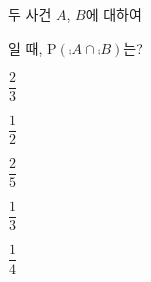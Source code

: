두 사건 $A$, $B$에 대하여 \par\smallskip{}\par\smallskip\noindent 일 때, $\mathrm{P}(\comp{A}\cap\comp{B})$는?
\begin{choices32}{\rule[-3ex]{0pt}{8ex}$\dfrac{2}{3}$}{\rule[-3ex]{0pt}{8ex}$\dfrac{1}{2}$}{\rule[-3ex]{0pt}{8ex}$\dfrac{2}{5}$}{\rule[-3ex]{0pt}{8ex}$\dfrac{1}{3}$}{\rule[-3ex]{0pt}{8ex}$\dfrac{1}{4}$}\end{choices32}
